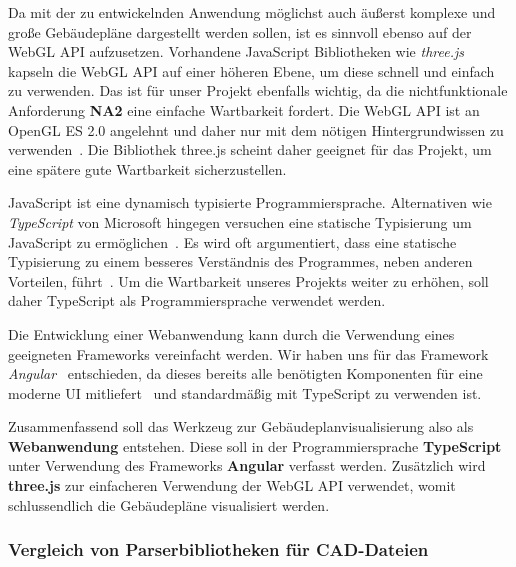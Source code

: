 Da mit der zu entwickelnden Anwendung möglichst auch äußerst komplexe und große Gebäudepläne dargestellt werden sollen, ist es sinnvoll ebenso auf der WebGL API aufzusetzen.
Vorhandene JavaScript Bibliotheken wie \textit{three.js}~\cite{ThreeJS} kapseln die WebGL API auf einer höheren Ebene, um diese schnell und einfach zu verwenden.
Das ist für unser Projekt ebenfalls wichtig, da die nichtfunktionale Anforderung \textbf{NA2} eine einfache Wartbarkeit fordert.
Die WebGL API ist an OpenGL ES 2.0 angelehnt und daher nur mit dem nötigen Hintergrundwissen zu verwenden~\cite{WebGL}.
Die Bibliothek three.js scheint daher geeignet für das Projekt, um eine spätere gute Wartbarkeit sicherzustellen.

JavaScript ist eine dynamisch typisierte Programmiersprache.
Alternativen wie \textit{TypeScript} von Microsoft hingegen versuchen eine statische Typisierung um JavaScript zu ermöglichen~\cite{ToTypeOrNotToType}.
Es wird oft argumentiert, dass eine statische Typisierung zu einem besseres Verständnis des Programmes, neben anderen Vorteilen, führt~\cite{ToTypeOrNotToType}.
Um die Wartbarkeit unseres Projekts weiter zu erhöhen, soll daher TypeScript als Programmiersprache verwendet werden.

Die Entwicklung einer Webanwendung kann durch die Verwendung eines geeigneten Frameworks vereinfacht werden.
Wir haben uns für das Framework \textit{Angular}~\cite{Angular} entschieden, da dieses bereits alle benötigten Komponenten für eine moderne UI mitliefert~\cite{AngularMaterial} und standardmäßig mit TypeScript zu verwenden ist.

Zusammenfassend soll das Werkzeug zur Gebäudeplanvisualisierung also als \textbf{Webanwendung} entstehen.
Diese soll in der Programmiersprache \textbf{TypeScript} unter Verwendung des Frameworks \textbf{Angular} verfasst werden.
Zusätzlich wird \textbf{three.js} zur einfacheren Verwendung der WebGL API verwendet, womit schlussendlich die Gebäudepläne visualisiert werden.

\subsubsection{Vergleich von Parserbibliotheken für CAD-Dateien}
\label{subsubsec:comparison-parser-libs}
